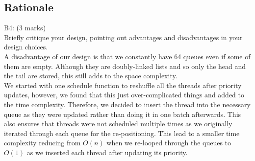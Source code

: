 \documentclass[11pt, a4paper]{article}
\begin{document}
	\subsection{Rationale}
		B4: (3 marks)\\
		Briefly critique your design, pointing out advantages and disadvantages in your design 
		choices.\bigskip\\
		A disadvantage of our design is that we constantly have 64 queues even if some of them are empty. Although they are doubly-linked lists and so only the head and the tail are stored, this still adds to the space complexity. \\
		We started with one schedule function to reshuffle all the threads after priority updates, however, we found that this just over-complicated things and added to the time complexity. Therefore, we 
    decided to insert the thread into the necessary queue as they were updated rather than doing it in one batch afterwards. This also ensures that threads were not scheduled multiple times as we originally 
    iterated through each queue for the re-positioning. This lead to a smaller time complexity reducing from $O(n)$ when we re-looped through the queues to $O(1)$ as we inserted each thread after updating
    its priority.
\end{document}
